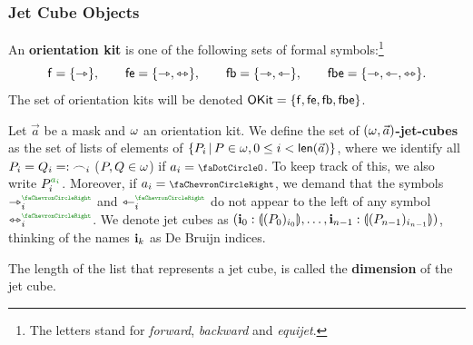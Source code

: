 \documentclass[a4paper]{memoir}
\begin{document}
\subsubsection{Jet Cube Objects}
\begin{definition} \label{def:orientation-kit}
	An \textbf{orientation kit} is one of the following sets of formal symbols:\footnote{The letters stand for \emph{forward}, \emph{backward} and \emph{equijet}.}
	\[
		{\mathsf{f}} = \mathopen{}\left\{ {\rightarrowtriangle} \right\}\mathclose{}, \qquad
		{\mathsf{fe}} = \mathopen{}\left\{ {\rightarrowtriangle}, {\leftrightarrowtriangle} \right\}\mathclose{}, \qquad
		{\mathsf{fb}} = \mathopen{}\left\{ {\rightarrowtriangle}, {\leftarrowtriangle} \right\}\mathclose{}, \qquad
		{\mathsf{fbe}} = \mathopen{}\left\{ {\rightarrowtriangle}, {\leftarrowtriangle}, {\leftrightarrowtriangle} \right\}\mathclose{}.
	\]
	The set of orientation kits will be denoted ${\mathsf{OKit}} = \mathopen{}\left\{ {\mathsf{f}}, {\mathsf{fe}}, {\mathsf{fb}}, {\mathsf{fbe}} \right\}\mathclose{}$.
\end{definition}
\begin{definition} \label{def:jet-cube}
	Let $\vec a$ be a mask and $\omega$ an orientation kit.
	We define the set of \textbf{$(\omega, \vec{a})$-jet-cubes} as the set of lists of elements of $\mathopen{}\left\{ P_i \,\middle|\, P \in \omega, 0 \leq i < \mathsf{len}(\vec a) \right\}\mathclose{}$,
	where we identify all $P_i = Q_i =: {\frown}_i$ ($P, Q \in \omega$) if $a_i = \npolar$.
	To keep track of this, we also write $P_i\pmr{a_i}$.
	Moreover, if $a_i = \ypolar$, we demand that the symbols $\jet_i\pmr{\ypolar}$ and $\tej_i\pmr{\ypolar}$ do not appear to the left of any symbol $\equijet_i\pmr{\ypolar}$.
	We denote jet cubes as
	$(\mathbf{i}_0 : {\llparenthesis (P_0)_{i_0} \rrparenthesis}, \ldots, \mathbf{i}_{n-1} : {\llparenthesis (P_{n-1})_{i_{n-1}} \rrparenthesis})$,
	thinking of the names $\mathbf{i}_k$ as De Bruijn indices.
	
	The length of the list that represents a jet cube, is called the \textbf{dimension} of the jet cube.
	
%	
%	
\end{definition}
\end{document}
